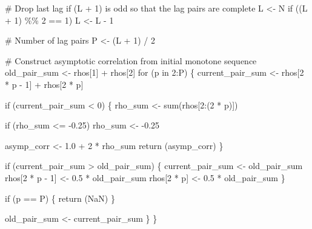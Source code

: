 \documentclass[
  letterpaper,
  DIV=11,
  numbers=noendperiod]{scrartcl}
\newenvironment{Shaded}{\begin{snugshade}}{\end{snugshade}}
\newcommand{\BuiltInTok}[1]{\textcolor[rgb]{0.00,0.23,0.31}{#1}}
\newcommand{\CommentTok}[1]{\textcolor[rgb]{0.37,0.37,0.37}{#1}}
\newcommand{\ControlFlowTok}[1]{\textcolor[rgb]{0.00,0.23,0.31}{#1}}
\newcommand{\DecValTok}[1]{\textcolor[rgb]{0.68,0.00,0.00}{#1}}
\newcommand{\FloatTok}[1]{\textcolor[rgb]{0.68,0.00,0.00}{#1}}
\newcommand{\KeywordTok}[1]{\textcolor[rgb]{0.00,0.23,0.31}{#1}}
\newcommand{\NormalTok}[1]{\textcolor[rgb]{0.00,0.23,0.31}{#1}}
\newcommand{\OperatorTok}[1]{\textcolor[rgb]{0.37,0.37,0.37}{#1}}
\begin{document}
\begin{Shaded}
\begin{Highlighting}[]
  \CommentTok{\# Drop last lag if (L + 1) is odd so that the lag pairs are complete}
\NormalTok{  L }\OperatorTok{\textless{}{-}}\NormalTok{ N}
  \ControlFlowTok{if}\NormalTok{ ((L }\OperatorTok{+} \DecValTok{1}\NormalTok{) }\OperatorTok{\%\%} \DecValTok{2} \OperatorTok{==} \DecValTok{1}\NormalTok{)}
\NormalTok{    L }\OperatorTok{\textless{}{-}}\NormalTok{ L }\OperatorTok{{-}} \DecValTok{1}

  \CommentTok{\# Number of lag pairs}
\NormalTok{  P }\OperatorTok{\textless{}{-}}\NormalTok{ (L }\OperatorTok{+} \DecValTok{1}\NormalTok{) }\OperatorTok{/} \DecValTok{2}

  \CommentTok{\# Construct asymptotic correlation from initial monotone sequence}
\NormalTok{  old\_pair\_sum }\OperatorTok{\textless{}{-}}\NormalTok{ rhos[}\DecValTok{1}\NormalTok{] }\OperatorTok{+}\NormalTok{ rhos[}\DecValTok{2}\NormalTok{]}
  \ControlFlowTok{for}\NormalTok{ (p }\KeywordTok{in} \DecValTok{2}\NormalTok{:P) \{}
\NormalTok{    current\_pair\_sum }\OperatorTok{\textless{}{-}}\NormalTok{ rhos[}\DecValTok{2} \OperatorTok{*}\NormalTok{ p }\OperatorTok{{-}} \DecValTok{1}\NormalTok{] }\OperatorTok{+}\NormalTok{ rhos[}\DecValTok{2} \OperatorTok{*}\NormalTok{ p]}

    \ControlFlowTok{if}\NormalTok{ (current\_pair\_sum }\OperatorTok{\textless{}} \DecValTok{0}\NormalTok{) \{}
\NormalTok{      rho\_sum }\OperatorTok{\textless{}{-}} \BuiltInTok{sum}\NormalTok{(rhos[}\DecValTok{2}\NormalTok{:(}\DecValTok{2} \OperatorTok{*}\NormalTok{ p)])}
    
      \ControlFlowTok{if}\NormalTok{ (rho\_sum }\OperatorTok{\textless{}=} \OperatorTok{{-}}\FloatTok{0.25}\NormalTok{)}
\NormalTok{        rho\_sum }\OperatorTok{\textless{}{-}} \OperatorTok{{-}}\FloatTok{0.25}
    
\NormalTok{      asymp\_corr }\OperatorTok{\textless{}{-}} \FloatTok{1.0} \OperatorTok{+} \DecValTok{2} \OperatorTok{*}\NormalTok{ rho\_sum}
      \ControlFlowTok{return}\NormalTok{ (asymp\_corr)}
\NormalTok{    \}}
  
    \ControlFlowTok{if}\NormalTok{ (current\_pair\_sum }\OperatorTok{\textgreater{}}\NormalTok{ old\_pair\_sum) \{}
\NormalTok{      current\_pair\_sum }\OperatorTok{\textless{}{-}}\NormalTok{ old\_pair\_sum}
\NormalTok{      rhos[}\DecValTok{2} \OperatorTok{*}\NormalTok{ p }\OperatorTok{{-}} \DecValTok{1}\NormalTok{] }\OperatorTok{\textless{}{-}} \FloatTok{0.5} \OperatorTok{*}\NormalTok{ old\_pair\_sum}
\NormalTok{      rhos[}\DecValTok{2} \OperatorTok{*}\NormalTok{ p]     }\OperatorTok{\textless{}{-}} \FloatTok{0.5} \OperatorTok{*}\NormalTok{ old\_pair\_sum}
\NormalTok{    \}}
  
    \ControlFlowTok{if}\NormalTok{ (p }\OperatorTok{==}\NormalTok{ P) \{}
      \ControlFlowTok{return}\NormalTok{ (NaN)}
\NormalTok{    \}}
  
\NormalTok{    old\_pair\_sum }\OperatorTok{\textless{}{-}}\NormalTok{ current\_pair\_sum}
\NormalTok{  \}}
\NormalTok{\}}
\end{Highlighting}
\end{Shaded}
\end{document}
